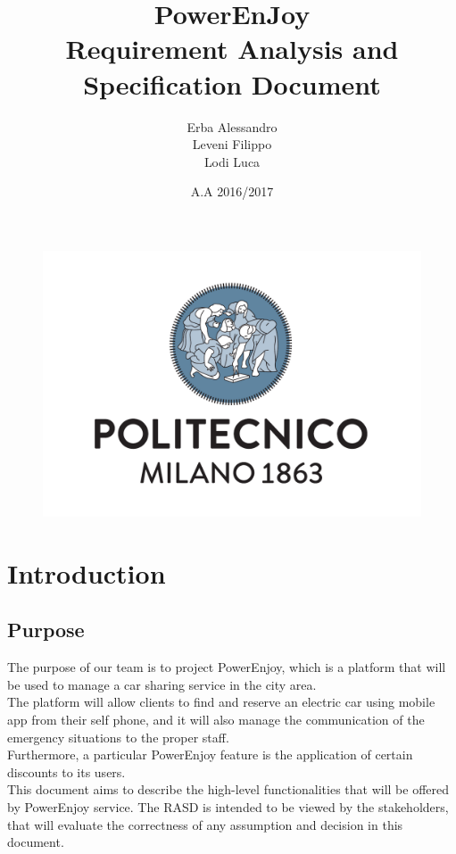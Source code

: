 \documentclass[english]{article}
\begin{document}
\begin{figure}
	\centering
	\includegraphics[scale=0.5]{logo.pdf} 
\end{figure}


\title{PowerEnJoy\\
 Requirement Analysis and Specification Document\\
}

\date{A.A 2016/2017}

\author{Erba Alessandro\\
 Leveni Filippo\\
 Lodi Luca}

\maketitle
\pagebreak{}

\tableofcontents{} \pagebreak{}

\section{Introduction}
	\subsection{Purpose }
	
		The purpose of our team is to project PowerEnjoy, which is  a platform that will be used to manage a car sharing service 
		in the city area.\\
		The platform will allow clients to find and reserve an electric car using mobile app from their self phone, and it will also 			manage the communication of the emergency situations to the proper staff.\\
		Furthermore, a particular PowerEnjoy feature is the application of certain discounts to its users.\\
		\tab \tab This document aims to describe the high-level functionalities that will be offered by PowerEnjoy service. The 			RASD is intended to be viewed by the stakeholders, that will evaluate the correctness of any assumption and decision
		in this document.
		
\end{document}
